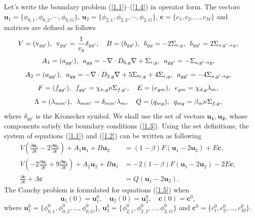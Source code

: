 \documentclass[a4paper]{jpconf}
\begin{document}
Let's write the boundary problem (\ref{1.1})--(\ref{1.4}) in operator form. 
The vectors $\bm u_1 = \{\phi_{0,1}, \phi_{0,2}, \cdots, \phi_{0,G}\}$, $\bm u_2 = \{\phi_{2,1}, \phi_{2,2}, \cdots, \phi_{2,G}\}$, $\bm c = \{c_1, c_2, ..., c_M\}$ and matrices are defined as follows
\[
V = (\mathrm{v}_{gg'}),
\enskip
\mathrm{v}_{gg'} = \frac{1}{v_g} \delta_{gg'},
\quad
B = (b_{gg'}),
\enskip
b_{gg} = -2\Sigma_{r,g},
\enskip
b_{gg'} = 2\Sigma_{s, g' \rightarrow g},
\]
\[
A_1 = (a_{gg'}),
\enskip
a_{gg} = -\nabla \cdot D_{0,g} \nabla + \Sigma_{r,g},
\enskip
a_{gg'} = -\Sigma_{s, g' \rightarrow g},
\]
\[
A_2 = (a_{gg'}),
\enskip
a_{gg} = -\nabla \cdot D_{2,g} \nabla + 5\Sigma_{tr,g} + 4\Sigma_{r,g},
\enskip
a_{gg'} = -4\Sigma_{s, g' \rightarrow g},
\]
\[
F = (f_{gg'}),
\enskip
f_{gg'} = \chi_{n,g}\nu\Sigma_{f,g'},
\quad
E =(e_{gm}),
\enskip
e_{gm} = \chi_{d,g}\lambda_m,
\]
\[
\Lambda = (\lambda_{mm'}), 
\enskip
\lambda_{mm'} = \delta_{mm'}\lambda_m,
\quad
Q = (q_{mg}),
\enskip
q_{mg} =\beta_m \nu\Sigma_{f,g},
\]
where
$\delta_{g g'}$ is the Kronecker symbol.
We shall use the set of vectors $\bm {u_1, u_2}$, whose components satisfy the boundary conditions (\ref{1.3}). 
Using the set definitions, the system of equations (\ref{1.1}) and (\ref{1.2}) can be written as following
\begin{equation}\label{1.5}
\begin{split}
V (\frac{\partial \bm u_1}{\partial t} - 2 \frac{\partial \bm u_2}{\partial t}) + A_1 \bm u_1 + B \bm u_2 &=(1-\beta) F (\bm u_1 - 2\bm u_2) + E\bm c,
\\
V(- 2 \frac{\partial \bm u_1}{\partial t} + 9 \frac{\partial \bm u_2}{\partial t} ) + A_2 \bm u_2 + B \bm u_1 &=-2(1-\beta) F (\bm u_1 - 2\bm u_2) - 2E\bm c,
\\
\frac{\partial \bm c}{\partial t} + \Lambda \bm c &= Q (\bm u_1 - 2\bm u_2). 
\end{split}
\end{equation}
The Cauchy problem is formulated for equations (\ref{1.5}) when
\begin{equation}\label{1.7}
 \bm u_1(0) = \bm u_1^0, \quad  \bm u_2(0) = \bm u_2^0, \quad \bm c(0) = \bm c^0,
\end{equation} 
where $\bm u_1^0 = \{\phi_{0,1}^0,  \phi_{0,2}^0, ...,  \phi_{0,G}^0 \}$, 
$\bm u_2^0 = \{\phi_{2,1}^0,  \phi_{2,2}^0, ...,  \phi_{2,G}^0 \}$ and 
$\bm c^0 = \{ c_1^0,  c_2^0, ...,  c_M^0 \}$.
\end{document}
